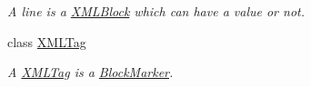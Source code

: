 \begin{DoxyCompactItemize}
\begin{DoxyCompactList}\small\item\em A line is a \hyperlink{class_a_rdev_kit_1_1_model_1_1_project_1_1_file_1_1_x_m_l_block}{X\-M\-L\-Block} which can have a value or not. \end{DoxyCompactList}\item 
class \hyperlink{class_a_rdev_kit_1_1_model_1_1_project_1_1_file_1_1_x_m_l_tag}{X\-M\-L\-Tag}
\begin{DoxyCompactList}\small\item\em A \hyperlink{class_a_rdev_kit_1_1_model_1_1_project_1_1_file_1_1_x_m_l_tag}{X\-M\-L\-Tag} is a \hyperlink{class_a_rdev_kit_1_1_model_1_1_project_1_1_file_1_1_block_marker}{Block\-Marker}. \end{DoxyCompactList}\end{DoxyCompactItemize}
